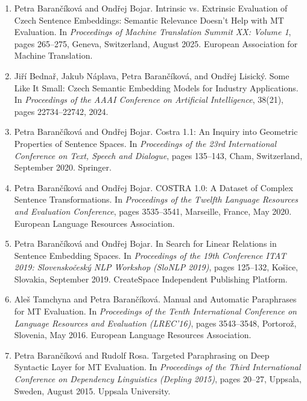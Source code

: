 \documentclass[12pt,a4paper]{report}
\begin{document}
\begin{enumerate}
    \item Petra Barančíková and Ondřej Bojar. Intrinsic vs. Extrinsic Evaluation of Czech Sentence Embeddings: Semantic Relevance Doesn’t Help with MT Evaluation. In \textit{Proceedings of Machine Translation Summit XX: Volume 1}, pages 265--275, Geneva, Switzerland, August 2025. European Association for Machine Translation.

    \item Jiří Bednař, Jakub Náplava, Petra Barančíková, and Ondřej Lisický. Some Like It Small: Czech Semantic Embedding Models for Industry Applications. In \textit{Proceedings of the AAAI Conference on Artificial Intelligence}, 38(21), pages 22734--22742, 2024. 

    \item Petra Barančíková and Ondřej Bojar. Costra 1.1: An Inquiry into Geometric Properties of Sentence Spaces. In \textit{Proceedings of the 23rd International Conference on Text, Speech and Dialogue}, pages 135--143, Cham, Switzerland, September 2020. Springer. 

    \item Petra Barančíková and Ondřej Bojar. COSTRA 1.0: A Dataset of Complex Sentence Transformations. In \textit{Proceedings of the Twelfth Language Resources and Evaluation Conference}, pages 3535--3541, Marseille, France, May 2020. European Language Resources Association. 

    \item Petra Barančíková and Ondřej Bojar. In Search for Linear Relations in Sentence Embedding Spaces. In \textit{Proceedings of the 19th Conference ITAT 2019: Slovenskočeský NLP Workshop (SloNLP 2019)}, pages 125--132, Košice, Slovakia, September 2019. CreateSpace Independent Publishing Platform. 

    \item Aleš Tamchyna and Petra Barančíková. Manual and Automatic Paraphrases for MT Evaluation. In \textit{Proceedings of the Tenth International Conference on Language Resources and Evaluation (LREC'16)}, pages 3543--3548, Portorož, Slovenia, May 2016. European Language Resources Association. 

    \item Petra Barančíková and Rudolf Rosa. Targeted Paraphrasing on Deep Syntactic Layer for MT Evaluation. In \textit{Proceedings of the Third International Conference on Dependency Linguistics (Depling 2015)}, pages 20--27, Uppsala, Sweden, August 2015. Uppsala University. 


\end{enumerate}
\end{document}
